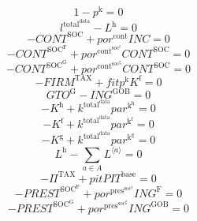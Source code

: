 \begin{equation}
1 - p^{\mathrm{k}} = 0
\end{equation}
\begin{equation}
l^{\mathrm{total}^{\mathrm{data}}} - L^{\mathrm{h}} = 0
\end{equation}
\begin{equation}
-{C\!O\!N\!T}^{\mathrm{SOC}} + {{p\!o\!r}^{\mathrm{cont}}} {{I\!N\!C}} = 0
\end{equation}
\begin{equation}
-{C\!O\!N\!T}^{\mathrm{SOC}^{\mathrm{F}}} + {{p\!o\!r}^{\mathrm{cont}^{\mathrm{soc}^{\mathrm{f}}}}} {{C\!O\!N\!T}^{\mathrm{SOC}}} = 0
\end{equation}
\begin{equation}
-{C\!O\!N\!T}^{\mathrm{SOC}^{\mathrm{G}}} + {{p\!o\!r}^{\mathrm{cont}^{\mathrm{soc}^{\mathrm{g}}}}} {{C\!O\!N\!T}^{\mathrm{SOC}}} = 0
\end{equation}
\begin{equation}
-{F\!I\!R\!M}^{\mathrm{TAX}} + {{f\!i\!t}} {p^{\mathrm{k}}} {K^{\mathrm{f}}} = 0
\end{equation}
\begin{equation}
{G\!T\!O}^{\mathrm{G}} - {I\!N\!G}^{\mathrm{GOB}} = 0
\end{equation}
\begin{equation}
-K^{\mathrm{h}} + {k^{\mathrm{total}^{\mathrm{data}}}} {{p\!a\!r}^{\mathrm{k}^{\mathrm{h}}}} = 0
\end{equation}
\begin{equation}
-K^{\mathrm{f}} + {k^{\mathrm{total}^{\mathrm{data}}}} {{p\!a\!r}^{\mathrm{k}^{\mathrm{f}}}} = 0
\end{equation}
\begin{equation}
-K^{\mathrm{g}} + {k^{\mathrm{total}^{\mathrm{data}}}} {{p\!a\!r}^{\mathrm{k}^{\mathrm{g}}}} = 0
\end{equation}
\begin{equation}
L^{\mathrm{h}} - \sum_{a\in A} {L}^{\langle a\rangle} = 0
\end{equation}
\begin{equation}
-\Pi^{\mathrm{TAX}} + {{p\!i\!t}} {{P\!I\!T}^{\mathrm{base}}} = 0
\end{equation}
\begin{equation}
-{P\!R\!E\!S\!T}^{\mathrm{SOC}^{\mathrm{F}}} + {{p\!o\!r}^{\mathrm{pres}^{\mathrm{soc}^{\mathrm{f}}}}} {{I\!N\!G}^{\mathrm{F}}} = 0
\end{equation}
\begin{equation}
-{P\!R\!E\!S\!T}^{\mathrm{SOC}^{\mathrm{G}}} + {{p\!o\!r}^{\mathrm{pres}^{\mathrm{soc}^{\mathrm{g}}}}} {{I\!N\!G}^{\mathrm{GOB}}} = 0
\end{equation}
